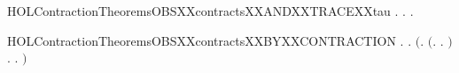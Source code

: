 \newcommand{\HOLContractionTheoremsOBSXXcontractsXXANDXXTRACEXXlabel}{\UseVerbatim{HOLContractionTheoremsOBSXXcontractsXXANDXXTRACEXXlabel}}
\begin{SaveVerbatim}{HOLContractionTheoremsOBSXXcontractsXXANDXXTRACEXXtau}
\HOLTokenTurnstile{} \HOLSymConst{\HOLTokenForall{}} .
          \HOLSymConst{\HOLTokenImp{}}
       \HOLSymConst{\HOLTokenForall{}} .
               \HOLSymConst{\HOLTokenConj{}}   \HOLSymConst{\HOLTokenImp{}}
           \HOLSymConst{\HOLTokenExists{}} .
                   \HOLSymConst{\HOLTokenConj{}}    \HOLSymConst{\HOLTokenConj{}}
                 \HOLSymConst{\HOLTokenLeq{}}   \HOLSymConst{\HOLTokenConj{}}  
\end{SaveVerbatim}
\newcommand{\HOLContractionTheoremsOBSXXcontractsXXANDXXTRACEXXtau}{\UseVerbatim{HOLContractionTheoremsOBSXXcontractsXXANDXXTRACEXXtau}}
\begin{SaveVerbatim}{HOLContractionTheoremsOBSXXcontractsXXBYXXCONTRACTION}
\HOLTokenTurnstile{} \HOLSymConst{\HOLTokenForall{}}.
         \HOLSymConst{\HOLTokenImp{}}
       \HOLSymConst{\HOLTokenForall{}} .
           \ensuremath{(}\HOLSymConst{\HOLTokenForall{}}.
                \ensuremath{(}\HOLSymConst{\HOLTokenForall{}}.  \HOLTokenTransBegin{}\HOLTokenTransEnd {} \HOLSymConst{\HOLTokenImp{}} \HOLSymConst{\HOLTokenExists{}}.  \HOLTokenTransBegin{}\HOLTokenTransEnd {} \HOLSymConst{\HOLTokenConj{}}   \ensuremath{)} \HOLSymConst{\HOLTokenConj{}}
                \HOLSymConst{\HOLTokenForall{}}.  \HOLTokenTransBegin{}\HOLTokenTransEnd {} \HOLSymConst{\HOLTokenImp{}} \HOLSymConst{\HOLTokenExists{}}.  \HOLTokenWeakTransBegin{}\HOLTokenWeakTransEnd {} \HOLSymConst{\HOLTokenConj{}}   \ensuremath{)} \HOLSymConst{\HOLTokenImp{}}
             
\end{SaveVerbatim}
